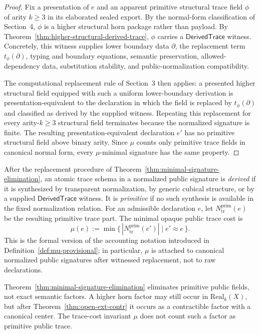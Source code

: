 \documentclass{lmcs}
\begin{document}
\begin{proof}
Fix a presentation of \(e\) and an apparent primitive structural trace field \(\phi\) of arity
\(k\geq 3\) in its elaborated sealed export.  By the normal-form classification of Section~4,
\(\phi\) is a higher structural horn package rather than payload.  By
Theorem~\ref{thm:higher-structural-derived-trace}, \(\phi\) carries a
\(\mathsf{DerivedTrace}\) witness.  Concretely, this witness supplies lower boundary data
\(\partial\), the replacement term \(t_\phi(\partial)\), typing and boundary equations,
semantic preservation, allowed-dependency data, substitution stability, and
public-normalization compatibility.

The computational replacement rule of Section~3 then applies: a presented higher structural
field equipped with such a uniform lower-boundary derivation is presentation-equivalent to
the declaration in which the field is replaced by \(t_{\phi}(\partial)\) and classified as
derived by the supplied witness.
Repeating this replacement for every arity-\(k\geq 3\) structural field terminates because the
normalized signature is finite.  The resulting presentation-equivalent declaration \(e'\) has
no primitive structural field above binary arity.  Since \(\mu\) counts only primitive trace
fields in canonical normal form, every \(\mu\)-minimal signature has the same property.
\end{proof}

\begin{defi}
\label{def:primitive-status-mu}
After the replacement procedure of Theorem~\ref{thm:minimal-signature-elimination}, an atomic
trace schema in a normalized public signature is \emph{derived} if it is synthesized by
transparent normalization, by generic cubical structure, or by a supplied
\(\mathsf{DerivedTrace}\) witness.  It is \emph{primitive} if no such synthesis is available in
the fixed normalization relation.  For an admissible declaration \(e\), let
\(N_{\mathrm{tr}}^{\mathrm{prim}}(e)\) be the resulting primitive trace part.  The minimal
opaque public trace cost is
\[
  \mu(e)
  :=
  \min\{\, |N_{\mathrm{tr}}^{\mathrm{prim}}(e')| \mid e'\approx e \,\}.
\]
This is the formal version of the accounting notation introduced in
Definition~\ref{def:mu-provisional}; in particular, \(\mu\) is attached to canonical
normalized public signatures after witnessed replacement, not to raw declarations.
\end{defi}

\begin{rem}
Theorem~\ref{thm:minimal-signature-elimination} eliminates primitive public fields, not exact
semantic factors.  A higher horn factor may still occur in \(\mathrm{Real}_k(X)\), but after
Theorem~\ref{thm:open-ext-contr} it occurs as a contractible factor with a canonical center.
The trace-cost invariant \(\mu\) does not count such a factor as primitive public trace.
\end{rem}
\end{document}
